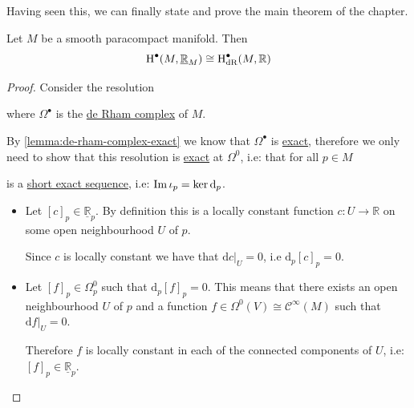\documentclass[../../main]{subfiles}
\begin{document}
Having seen this, we can finally state and prove the main theorem of the chapter.
\begin{theorem}
  Let \(M\) be a smooth paracompact manifold.
  Then
  \begin{equation*}
     \operatorname{H}^{\bullet}(M, \underline{\mathbb{R}}_{M}) \cong \operatorname{H}^{\bullet}_{\operatorname{dR}}(M, \mathbb{R})
  \end{equation*}
\end{theorem}
\begin{proof}
  Consider the resolution
  \begin{center}
  \end{center}
  where \(\Omega^{\bullet}\) is the \hyperref[def:de-rham-complex]{de Rham complex} of \(M\).

  By \autoref{lemma:de-rham-complex-exact} we know that \(\Omega^{\bullet}\) is \hyperref[def:exact-sequence]{exact}, therefore we only need to show that this resolution is \hyperref[def:exact-sequence]{exact} at \(\Omega^{0}\), i.e: that for all \(p \in M\)
  \begin{center}
  \end{center}
  is a \hyperref[def:exact-sequence]{short exact sequence}, i.e: \(\operatorname*{Im} \iota_{p} = \ker \mathrm{d}_{p}\).

  \begin{itemize}
    \item[\(\subseteq\)] Let \([c]_{p} \in \underline{\mathbb{R}}_{p}\). By definition this is a locally constant function \(c: U \to \mathbb{R}\) on some open neighbourhood \(U\) of \(p\).

          Since \(c\) is locally constant we have that \(\mathrm{d}c|_{U} = 0\), i.e \(\mathrm{d}_{p}[c]_{p} = 0\).
    \item[\(\supseteq\)] Let \([f]_{p} \in \Omega_{p}^{0}\) such that \(\mathrm{d}_{p}[f]_{p} = 0\).
          This means that there exists an open neighbourhood \(U\) of \(p\) and a function \(f \in \Omega^{0}(V) \cong \mathcal{C}^{\infty}(M)\) such that \(\mathrm{d}f|_{U} = 0\).

          Therefore \(f\) is locally constant in each of the connected components of \(U\), i.e: \([f]_{p} \in \underline{\mathbb{R}}_{p}\).
  \end{itemize}


\end{proof}
\end{document}
